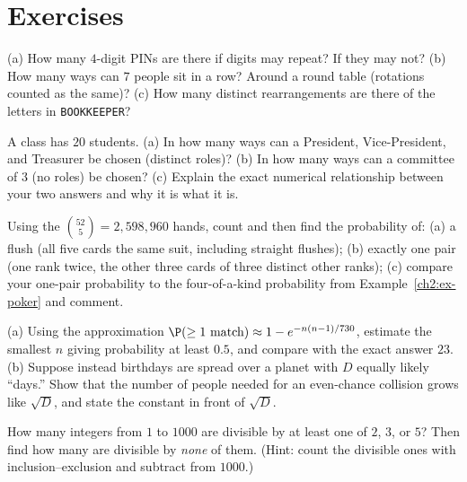 \section{Exercises}
\label{ch2:exercises}

\begin{exercise}
\label{ch2:exr-warmup}
(a) How many $4$-digit PINs are there if digits may repeat? If they may not?
(b) How many ways can $7$ people sit in a row? Around a round table (rotations counted as
the same)?
(c) How many distinct rearrangements are there of the letters in \texttt{BOOKKEEPER}?
\end{exercise}

\begin{exercise}
\label{ch2:exr-order}
A class has $20$ students. (a) In how many ways can a President, Vice-President, and
Treasurer be chosen (distinct roles)? (b) In how many ways can a committee of $3$
(no roles) be chosen? (c) Explain the exact numerical relationship between your two answers
and why it is what it is.
\end{exercise}

\begin{exercise}
\label{ch2:exr-poker}
Using the $\binom{52}{5} = 2{,}598{,}960$ hands, count and then find the probability of:
(a) a flush (all five cards the same suit, including straight flushes);
(b) exactly one pair (one rank twice, the other three cards of three distinct other ranks);
(c) compare your one-pair probability to the four-of-a-kind probability from
Example~\ref{ch2:ex-poker} and comment.
\end{exercise}

\begin{exercise}
\label{ch2:exr-birthday}
(a) Using the approximation $\P(\ge 1\text{ match}) \approx 1 - e^{-n(n-1)/730}$, estimate
the smallest $n$ giving probability at least $0.5$, and compare with the exact answer $23$.
(b) Suppose instead birthdays are spread over a planet with $D$ equally likely ``days.''
Show that the number of people needed for an even-chance collision grows like
$\sqrt{D}$, and state the constant in front of $\sqrt{D}$.
\end{exercise}

\begin{exercise}
\label{ch2:exr-incexc}
How many integers from $1$ to $1000$ are divisible by at least one of $2$, $3$, or $5$?
Then find how many are divisible by \emph{none} of them. (Hint: count the divisible ones
with inclusion--exclusion and subtract from $1000$.)
\end{exercise}

